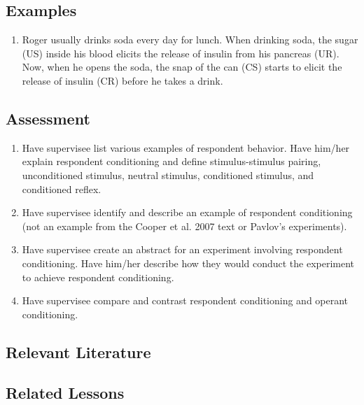 \subsection{Examples}
\begin{enumerate}
\item Roger usually drinks soda every day for lunch. When drinking soda, the sugar (US) inside his blood elicits the release of insulin from his pancreas (UR). Now, when he opens the soda, the snap of the can (CS) starts to elicit the release of insulin (CR) before he takes a drink. 
%
\end{enumerate}
%
\subsection{Assessment}
\begin{enumerate}
\item Have supervisee list various examples of respondent behavior. Have him/her explain respondent conditioning and define stimulus-stimulus pairing, unconditioned stimulus, neutral stimulus, conditioned stimulus, and conditioned reflex.
\item Have supervisee identify and describe an example of respondent conditioning (not an example from the Cooper et al. 2007 text or Pavlov's experiments). 
\item Have supervisee create an abstract for an experiment involving respondent conditioning. Have him/her describe how they would conduct the experiment to achieve respondent conditioning.
\item Have supervisee compare and contrast respondent conditioning and operant conditioning.
\end{enumerate}
%
\subsection{Relevant Literature}
\begin{refsection}
\nocite{catania1998learning,
        cooper2007applied,
        skinner1984evolution,
        poling2001principles,
        skinner1938behavior,
        pavlov1928lectures}
\printbibliography[heading=none]
\end{refsection}
%
\subsection{Related Lessons}
\fourFKTen{}\\
\fourFKThirteen{}\\
\fourFKFifteen{}\\
\fourFKSixteen{}\\
\fourFKSeventeen{}\\
\fourFKTwentyFour{}\\
\fourFKTwentySix{}\\
\fourFKThirtyFive{}\\
%
\clearpage \section{\fourFKFifteen{}}
